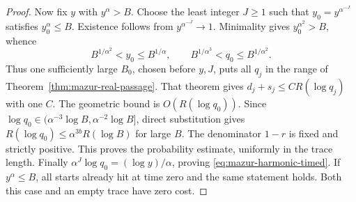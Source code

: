 \documentclass[11pt]{article}
\theoremstyle{remark}\newtheorem{remark}[proposition]{Remark}
\begin{document}
\begin{proof}
Now fix \(y\) with \(y^\alpha>B\).
Choose the least integer \(J\ge1\) such that
\(y_0=y^{\alpha^{-J}}\) satisfies \(y_0^\alpha\le B\).
Existence follows from \(y^{\alpha^{-J}}\to1\).
Minimality gives \(y_0^{\alpha^2}>B\), whence
\[
 B^{1/\alpha^2}<y_0\le B^{1/\alpha},\qquad
 B^{1/\alpha^3}<q_0\le B^{1/\alpha^2}.
\]
Thus one sufficiently large \(B_0\), chosen before \(y,J\), puts
all \(q_j\) in the range of Theorem~\ref{thm:mazur-real-passage}.
That theorem gives \(d_j+s_j\le C R(\log q_j)\) with one \(C\).
The geometric bound is \(O(R(\log q_0))\).
Since \(\log q_0\in(\alpha^{-3}\log B,\alpha^{-2}\log B]\),
direct substitution gives
\(R(\log q_0)\le\alpha^{3b}R(\log B)\) for large \(B\).
The denominator \(1-r\) is fixed and strictly positive.
This proves the probability estimate, uniformly in the trace length.
Finally \(\alpha^J\log q_0=(\log y)/\alpha\), proving
\eqref{eq:mazur-harmonic-timed}.
If \(y^\alpha\le B\), all starts already hit at time zero and the
same statement holds. Both this case and an empty trace have zero cost.
\end{proof}
\end{document}
